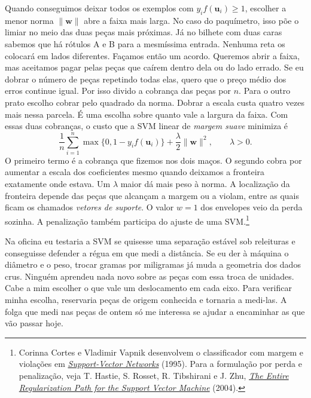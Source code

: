 Quando conseguimos deixar todos os exemplos com $y_i f(\boldsymbol u_i)\geq1$, escolher a menor norma $\lVert\boldsymbol w\rVert$ abre a faixa mais larga. No caso do paquímetro, isso põe o limiar no meio das duas peças mais próximas. Já no bilhete com duas caras sabemos que há rótulos A e B para a mesmíssima entrada. Nenhuma reta os colocará em lados diferentes. Façamos então um acordo. Queremos abrir a faixa, mas aceitamos pagar pelas peças que caírem dentro dela ou do lado errado. Se eu dobrar o número de peças repetindo todas elas, quero que o preço médio dos erros continue igual. Por isso divido a cobrança das peças por $n$. Para o outro prato escolho cobrar pelo quadrado da norma. Dobrar a escala custa quatro vezes mais nessa parcela. É uma escolha sobre quanto vale a largura da faixa. Com essas duas cobranças, o custo que a SVM linear de \emph{margem suave} minimiza é
\[
 \frac1n\sum_{i=1}^n \max\{0,1-y_i f(\boldsymbol u_i)\}
       +\frac{\lambda}{2}\lVert\boldsymbol w\rVert^2,\qquad \lambda>0.
\]
O primeiro termo é a cobrança que fizemos nos dois maços. O segundo cobra por aumentar a escala dos coeficientes mesmo quando deixamos a fronteira exatamente onde estava. Um $\lambda$ maior dá mais peso à norma. A localização da fronteira depende das peças que alcançam a margem ou a violam, entre as quais ficam os chamados \emph{vetores de suporte}. O valor $w=1$ dos envelopes veio da perda sozinha. A penalização também participa do ajuste de uma SVM.\footnote{Corinna Cortes e Vladimir Vapnik desenvolvem o classificador com margem e violações em \href{https://doi.org/10.1007/BF00994018}{\emph{Support-Vector Networks}} (1995). Para a formulação por perda e penalização, veja T. Hastie, S. Rosset, R. Tibshirani e J. Zhu, \href{https://jmlr.org/papers/v5/hastie04a.html}{\emph{The Entire Regularization Path for the Support Vector Machine}} (2004).}

Na oficina eu testaria a SVM se quisesse uma separação estável sob releituras e conseguisse defender a régua em que medi a distância. Se eu der à máquina o diâmetro e o peso, trocar gramas por miligramas já muda a geometria dos dados crus. Ninguém aprendeu nada novo sobre as peças com essa troca de unidades. Cabe a mim escolher o que vale um deslocamento em cada eixo. Para verificar minha escolha, reservaria peças de origem conhecida e tornaria a medi-las. A folga que medi nas peças de ontem só me interessa se ajudar a encaminhar as que vão passar hoje.

